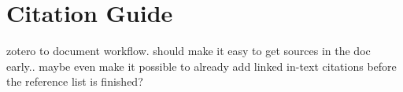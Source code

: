 \section{Citation Guide}
zotero to document workflow. should make it easy to get sources in the doc early.. maybe even make it possible to already add linked in-text citations before the reference list is finished?